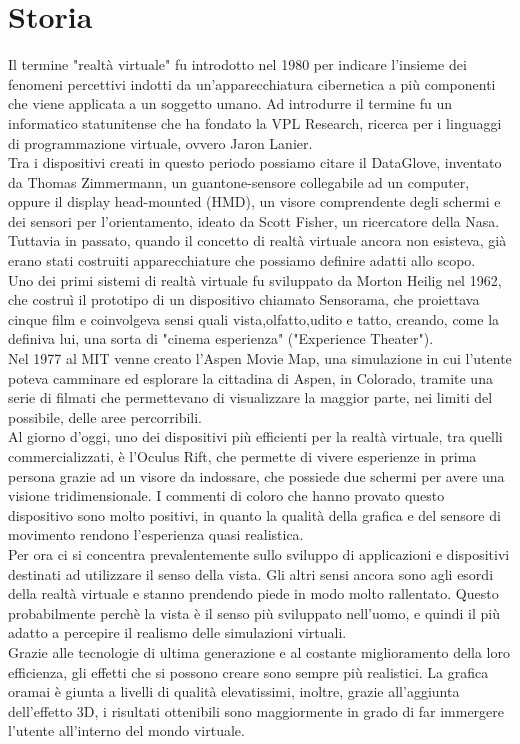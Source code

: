 \section{Storia}
Il termine "realtà virtuale" fu introdotto nel 1980  per indicare l'insieme dei fenomeni percettivi indotti da un'apparecchiatura cibernetica a più componenti che viene applicata a un soggetto umano.
Ad introdurre il termine fu un informatico statunitense che ha fondato la VPL Research, ricerca per i linguaggi di programmazione virtuale, ovvero Jaron Lanier.\\
Tra i dispositivi creati in questo periodo possiamo citare  il DataGlove, inventato da Thomas Zimmermann, un guantone-sensore collegabile ad un computer, oppure il display head-mounted (HMD), un visore comprendente degli schermi e dei sensori per l'orientamento, ideato da  Scott Fisher, un ricercatore della Nasa.\\
Tuttavia in passato, quando il concetto di realtà virtuale ancora non esisteva, già erano stati costruiti apparecchiature che possiamo definire adatti allo scopo.\\
Uno dei primi sistemi di realtà virtuale fu sviluppato da Morton Heilig nel 1962, che costruì il prototipo di un dispositivo chiamato Sensorama, che proiettava cinque film e coinvolgeva sensi quali vista,olfatto,udito e tatto, creando, come la definiva lui, una sorta di "cinema esperienza" ("Experience Theater").\\
Nel 1977 al MIT venne creato l'Aspen Movie Map, una simulazione in cui l'utente poteva camminare ed esplorare la cittadina di Aspen, in Colorado, tramite una serie di filmati che permettevano di visualizzare la maggior parte, nei limiti del possibile, delle aree percorribili.\\
Al giorno d'oggi, uno dei dispositivi più efficienti per la realtà virtuale, tra quelli commercializzati, è l'Oculus Rift, che permette di vivere esperienze in prima persona grazie ad un visore da indossare, che possiede due schermi per avere una visione tridimensionale.
I commenti di coloro che hanno provato questo dispositivo sono molto positivi, in quanto la qualità della grafica e del sensore di movimento rendono l'esperienza quasi realistica.\\
Per ora ci si concentra prevalentemente sullo sviluppo di applicazioni e dispositivi destinati ad utilizzare il senso della vista.
Gli altri sensi ancora sono agli esordi della realtà virtuale e stanno prendendo piede in modo molto rallentato.
Questo probabilmente perchè la vista è il senso più sviluppato nell'uomo, e quindi il più adatto a percepire il realismo delle simulazioni virtuali.\\
Grazie alle tecnologie di ultima generazione e al costante miglioramento della loro efficienza, gli effetti che si possono creare sono sempre più realistici.
La grafica oramai è giunta a livelli di qualità elevatissimi, inoltre, grazie all'aggiunta dell'effetto 3D, i risultati ottenibili sono maggiormente in grado di far immergere l'utente all'interno del mondo virtuale.\\





